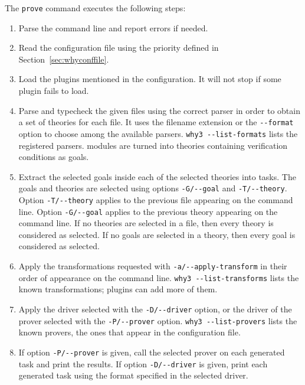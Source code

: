 The \texttt{prove} command executes the following steps:
\begin{enumerate}
\item Parse the command line and report errors if needed.
\item Read the configuration file using the priority defined in
  Section~\ref{sec:whyconffile}.
\item Load the plugins mentioned in the configuration. It will not
  stop if some plugin fails to load.
\item Parse and typecheck the given files using the correct parser in order
  to obtain a set of \why theories for each file. It uses
  the filename extension or the \verb|--format| option to choose
  among the available parsers. \verb|why3 --list-formats| lists
  the registered parsers.
  \whyml modules are turned into
  theories containing verification conditions as goals.
\item Extract the selected goals inside each of the selected theories
  into tasks. The goals and theories are selected using options
  \verb|-G/--goal| and \verb|-T/--theory|. Option
  \verb|-T/--theory| applies to the previous file appearing on the
  command line. Option \verb|-G/--goal| applies to the previous theory
  appearing on the command line. If no theories are selected in a file,
  then every theory is considered as selected. If no goals are selected
  in a theory, then every goal is considered as selected.
\item Apply the transformations requested
  with \verb|-a/--apply-transform| in their order of appearance on the
  command line. \verb|why3 --list-transforms| lists the known
  transformations; plugins can add more of them.
\item Apply the driver selected with the \verb|-D/--driver| option,
  or the driver of the prover selected with the \verb|-P/--prover|
  option. \verb|why3 --list-provers| lists the known provers, \ie the ones
  that appear in the configuration file.
\item If option \verb|-P/--prover| is given, call the selected prover
  on each generated task and print the results. If option
  \verb|-D/--driver| is given, print each generated task using
  the format specified in the selected driver.
\end{enumerate}

